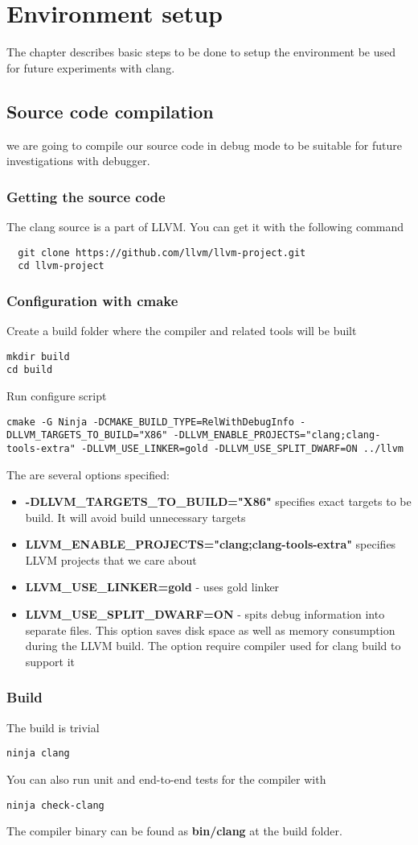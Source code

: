 \chapter{Environment setup}

The chapter describes basic steps to be done to setup the environment
be used for future experiments with clang.

\section{Source code compilation}

we are going to compile our source code in debug mode to be suitable
for future investigations with debugger.

\subsection{Getting the source code}

The clang source is a part of LLVM. You can get it with the following
command
\begin{verbatim}
  git clone https://github.com/llvm/llvm-project.git
  cd llvm-project
\end{verbatim}

\subsection{Configuration with cmake}
Create a build folder where the compiler and related tools will be
built
\begin{verbatim}
mkdir build
cd build
\end{verbatim}
Run configure script
\begin{verbatim}
cmake -G Ninja -DCMAKE_BUILD_TYPE=RelWithDebugInfo -DLLVM_TARGETS_TO_BUILD="X86" -DLLVM_ENABLE_PROJECTS="clang;clang-tools-extra" -DLLVM_USE_LINKER=gold -DLLVM_USE_SPLIT_DWARF=ON ../llvm
\end{verbatim}
The are several options specified:
\begin{itemize}
  \item \textbf{-DLLVM\_TARGETS\_TO\_BUILD="X86"} specifies exact
    targets to be build. It will avoid build unnecessary targets
  \item \textbf{LLVM\_ENABLE\_PROJECTS="clang;clang-tools-extra"}
    specifies LLVM projects that we care about
\item \textbf{LLVM\_USE\_LINKER=gold} - uses gold linker
\item \textbf{LLVM\_USE\_SPLIT\_DWARF=ON} - spits debug information into
  separate files. This option saves disk space as well as memory
  consumption during the LLVM build. The option require compiler used
  for clang build to support it
\end{itemize}


\subsection{Build}
The build is trivial
\begin{verbatim}
ninja clang
\end{verbatim}
You can also run unit and end-to-end tests for the compiler with
\begin{verbatim}
ninja check-clang
\end{verbatim}
The compiler binary can be found as \textbf{bin/clang} at the build folder. 
